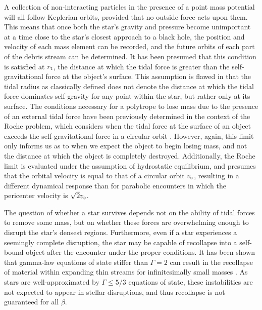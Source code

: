 \documentclass[twocolumn]{emulateapj}
\newcommand{\rt}{r_{\rm t}}
\begin{document}
A collection of non-interacting particles in the presence of a point mass potential will all follow Keplerian orbits, provided that no outside force acts upon them. This means that once both the star's gravity and pressure become unimportant at a time close to the star's closest approach to a black hole, the position and velocity of each mass element can be recorded, and the future orbits of each part of the debris stream can be determined. It has been presumed that this condition is satisfied at $\rt$, the distance at which the tidal force is greater than the self-gravitational force at the object's surface. This assumption is flawed in that the tidal radius as classically defined does not denote the distance at which the tidal force dominates self-gravity for any point within the star, but rather only at its surface. The conditions necessary for a polytrope to lose mass due to the presence of an external tidal force have been previously determined in the context of the Roche problem, which considers when the tidal force at the surface of an object exceeds the self-gravitational force in a circular orbit \citep{Aizenman:1968gn,Chandrasekhar:1969uj}. However, again, this limit only informs us as to when we expect the object to begin losing mass, and not the distance at which the object is completely destroyed. Additionally, the Roche limit is evaluated under the assumption of hydrostatic equilibrium, and presumes that the orbital velocity is equal to that of a circular orbit $v_{\rm c}$, resulting in a different dynamical response than for parabolic encounters in which the pericenter velocity is $\sqrt{2} v_{\rm c}$.

The question of whether a star survives depends not on the ability of tidal forces to remove some mass, but on whether these forces are overwhelming enough to disrupt the star's densest regions. Furthermore, even if a star experiences a seemingly complete disruption, the star may be capable of recollapse into a self-bound object after the encounter under the proper conditions. It has been shown that gamma-law equations of state stiffer than $\Gamma = 2$ can result in the recollapse of material within expanding thin streams for infinitesimally small masses \citep{Chandrasekhar:1961uk,Lee:2007em}. As stars are well-approximated by $\Gamma \leq 5/3$ equations of state, these instabilities are not expected to appear in stellar disruptions, and thus recollapse is not guaranteed for all $\beta$.
\end{document}
